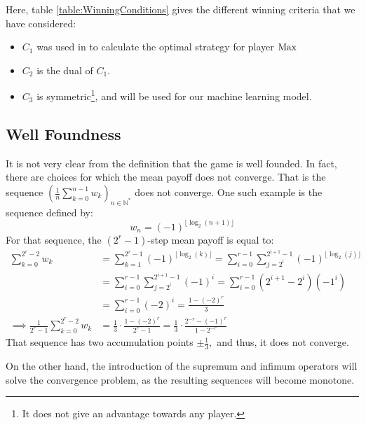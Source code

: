 Here, table \ref{table:WinningConditions} gives the different winning criteria that we have considered:
\begin{itemize}
	\item $C_1$ was used in \cite{MPGMaxAtom} to calculate the optimal strategy for player $\operatorname{Max}$
	\item $C_2$ is the dual of $C_1.$
	\item $C_3$ is symmetric\footnote{It does not give an advantage towards any player.}, and will be used for our machine learning model.
\end{itemize}
\subsection{Well Foundness}
It is not very clear from the definition that the game is well founded. \newline
In fact, there are choices for which the mean payoff does not converge. That is the sequence $\left(\frac{1}{n}\sum_{k=0}^{n-1} w_k \right)_{n\in\mathbb{N}^*}$ does not converge. \newline One such example is the sequence defined by:
$$
w_n=(-1)^{\lfloor  \log_2 (n+1)\rfloor}
$$
For that sequence, the $(2^r-1)$-step mean payoff is equal to:
\begin{align*}
	\sum_{k=0}^{2^r-2} w_k &= 	\sum_{k=1}^{2^r-1}(-1)^{\lfloor  \log_2 (k)\rfloor} = \sum_{i=0}^{r-1}\sum_{j=2^{i}}^{2^{i+1}-1}(-1)^{\lfloor  \log_2 (j)\rfloor} \\
	&=\sum_{i=0}^{r-1}\sum_{j=2^{i}}^{2^{i+1}-1}(-1)^i =\sum_{i=0}^{r-1}(2^{i+1}-2^i)(-1^i) \\
	&=\sum_{i=0}^{r-1}(-2)^i = \frac{1-(-2)^r}{3} \\
	\implies \frac{1}{2^r-1}\sum_{k=0}^{2^r-2} w_k  &= \frac{1}{3} \cdot \frac{1-(-2)^r}{2^r-1} = \frac{1}{3} \cdot \frac{2^{-r}-(-1)^r}{1-2^{-r}}
\end{align*}
That sequence has two accumulation points $\pm \frac{1}{3},$ and thus, it does not converge.

On the other hand, the introduction of the supremum and infimum operators will solve the convergence problem, as the resulting sequences will become monotone.

